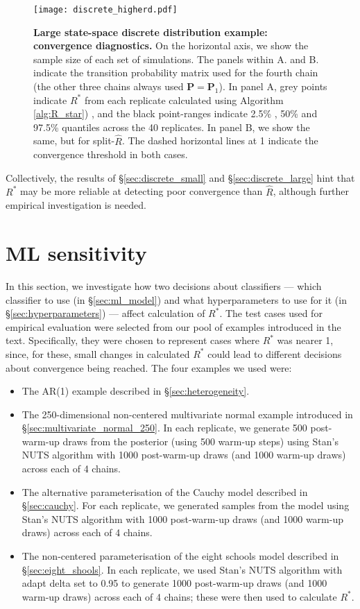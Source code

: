 \documentclass{article}
\begin{document}
\begin{figure}[!htb]
	\centerline{\texttt{[image: discrete\_higherd.pdf]}}
	\caption{\textbf{Large state-space discrete distribution example: convergence diagnostics.} On the horizontal axis, we show the sample size of each set of simulations. The panels within A. and B. indicate the transition probability matrix used for the fourth chain (the other three chains always used $\boldsymbol{P}=\boldsymbol{P}_1$). In panel A, grey points indicate $R^*$ from each replicate calculated using Algorithm \ref{alg:R_star}) , and the black point-ranges indicate 2.5\% , 50\% and 97.5\% quantiles across the 40 replicates. In panel B, we show the same, but for split-$\widehat{R}$. The dashed horizontal lines at 1 indicate the convergence threshold in both cases.}
	\label{fig:discrete_higherd}
\end{figure}

Collectively, the results of \S\ref{sec:discrete_small} and \S\ref{sec:discrete_large} hint that $R^*$ may be more reliable at detecting poor convergence than $\widehat{R}$, although further empirical investigation is needed.

\color{black}

\color{red}
\section{ML sensitivity}\label{sec:ML_sensitivity}
In this section, we investigate how two decisions about classifiers — which classifier to use (in \S\ref{sec:ml_model}) and what hyperparameters to use for it (in \S\ref{sec:hyperparameters}) — affect calculation of $R^*$. The test cases used for empirical evaluation were selected from our pool of examples introduced in the text. Specifically, they were chosen to represent cases where $R^*$ was nearer 1, since, for these, small changes in calculated $R^*$ could lead to different decisions about convergence being reached. The four examples we used were:

\begin{itemize}
	\item The AR(1) example described in \S\ref{sec:heterogeneity}.
	\item The 250-dimensional non-centered multivariate normal example introduced in \S\ref{sec:multivariate_normal_250}. In each replicate, we generate 500 post-warm-up draws from the posterior (using 500 warm-up steps) using Stan's NUTS algorithm with 1000 post-warm-up draws (and 1000 warm-up draws) across each of 4 chains.
	\item The alternative parameterisation of the Cauchy model described in \S\ref{sec:cauchy}. For each replicate, we generated samples from the model using Stan's NUTS algorithm with 1000 post-warm-up draws (and 1000 warm-up draws) across each of 4 chains.
	\item The non-centered parameterisation of the eight schools model described in \S\ref{sec:eight_shools}. In each replicate, we used Stan's NUTS algorithm with adapt delta set to 0.95 to generate 1000 post-warm-up draws (and 1000 warm-up draws) across each of 4 chains; these were then used to calculate $R^*$.
\end{itemize}
\end{document}
